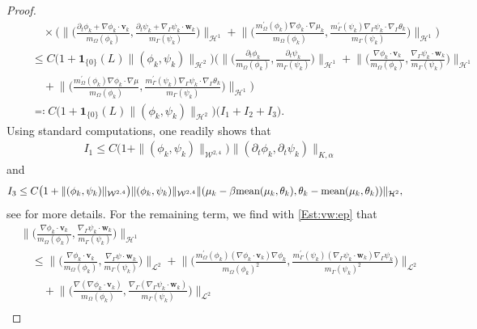 \documentclass[10pt,reqno]{amsart}
\theoremstyle{remark}
\numberwithin{equation}{section}
\newcommand{\norm}[1]{\| #1 \|}
\newcommand{\Bignorm}[1]{\Big\| #1 \Big\|}
\newcommand{\scp}[2]{ ( #1 , #2  )}
\newcommand{\mean}[2]{\textnormal{mean}\scp{#1}{#2}}
\newcommand{\bv}{\mathbf{v}}
\newcommand{\bw}{\mathbf{w}}
\newcommand{\delt}{\partial_{t}}
\newcommand{\Grad}{\nabla}
\newcommand{\Gradg}{\nabla_\Ga}
\newcommand{\Om}{\Omega}
\newcommand{\Ga}{\Gamma}
\begin{document}
\begin{proof}
\begin{align}
    &\qquad\times\Bigg( \Bignorm{\bigg(\frac{\delt\phi_k + \Grad\phi_k\cdot\bv_k}{m_\Om(\phi_k)},\frac{\delt\psi_k + \Gradg\psi_k\cdot\bw_k}{m_\Ga(\psi_k)}\bigg)}_{\mathcal{H}^1} + \Bignorm{\bigg(\frac{m_\Om^\prime(\phi_k)\Grad\phi_k\cdot\Grad\mu_k}{m_\Om(\phi_k)},\frac{m_\Ga^\prime(\psi_k)\Gradg\psi_k\cdot\Gradg\theta_k}{m_\Ga(\psi_k)}\bigg)}_{\mathcal{H}^1}\Bigg) \nonumber \\
    &\quad\leq C\big(1 + \mathbf{1}_{\{0\}}(L)\norm{(\phi_k,\psi_k)}_{\mathcal{H}^2}\big)\Bigg( \Bignorm{\bigg(\frac{\delt\phi_k}{m_\Om(\phi_k)},\frac{\delt\psi_k}{m_\Ga(\psi_k)}\bigg)}_{\mathcal{H}^1} + \Bignorm{\bigg(\frac{\Grad\phi_k\cdot\bv_k}{m_\Om(\phi_k)},\frac{\Gradg\psi_k\cdot\bw_k}{m_\Ga(\psi_k)}\bigg)}_{\mathcal{H}^1} \\
    &\qquad + \Bignorm{\bigg(\frac{m_\Om^\prime(\phi_k)\Grad\phi_k\cdot\Grad\mu}{m_\Om(\phi_k)},\frac{m_\Ga^\prime(\psi_k)\Gradg\psi_k\cdot\Gradg\theta_k}{m_\Ga(\psi_k)}\bigg)}_{\mathcal{H}^1}\Bigg) \nonumber \\
    &\quad\eqqcolon C\big(1 + \mathbf{1}_{\{0\}}(L)\norm{(\phi_k,\psi_k)}_{\mathcal{H}^2}\big)\big(I_1 + I_2 + I_3). \nonumber
\end{align}
Using standard computations, one readily shows that
\begin{align}\label{I1}
    I_1 \leq C\big(1 + \norm{(\phi_k,\psi_k)}_{\mathcal{W}^{2,4}}\big)\norm{(\delt\phi_k,\delt\psi_k)}_{K,\alpha}
\end{align}
and
\begin{align}\label{I3}
    I_3 &\leq C\big(1 + \norm{(\phi_k,\psi_k)}_{\mathcal{W}^{2,4}}\big)\norm{(\phi_k,\psi_k)}_{\mathcal{W}^{2,4}}\norm{(\mu_k - \beta\mean{\mu_k}{\theta_k}, \theta_k - \mean{\mu_k}{\theta_k})}_{\mathcal{H}^2},
\end{align}
see \cite[Eqn.~(6.10) ff.]{Stange2025} for more details. For the remaining term, we find with \eqref{Est:vw:ep} that
\begin{align}\label{I2}
    &\Bignorm{\bigg(\frac{\Grad\phi_k\cdot\bv_k}{m_\Om(\phi_k)},\frac{\Gradg\psi_k\cdot\bw_k}{m_\Ga(\psi_k)}\bigg)}_{\mathcal{H}^1} \nonumber \\
    &\quad\leq \Bignorm{\bigg(\frac{\Grad\phi_k\cdot\bv_k}{m_\Om(\phi_k)},\frac{\Gradg\psi\cdot\bw_k}{m_\Ga(\psi_k)}\bigg)}_{\mathcal{L}^2} + \Bignorm{\bigg(\frac{m_\Om^\prime(\phi_k)(\Grad\phi_k\cdot\bv_k)\Grad\phi_k}{m_\Om(\phi_k)^2},\frac{m_\Ga^\prime(\psi_k)(\Gradg\psi_k\cdot\bw_k)\Gradg\psi_k}{m_\Ga(\psi_k)^2}\bigg)}_{\mathcal{L}^2} \nonumber \\
    &\qquad + \Bignorm{\bigg(\frac{\Grad(\Grad\phi_k\cdot\bv_k)}{m_\Om(\phi_k)},\frac{\Gradg(\Gradg\psi_k\cdot\bw_k)}{m_\Ga(\psi_k)}\bigg)}_{\mathcal{L}^2} \\

\end{align}
\end{proof}
\end{document}
